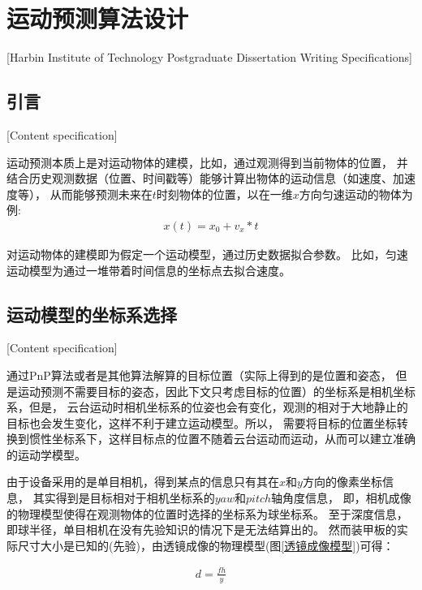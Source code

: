 


\chapter[运动预测算法设计]{运动预测算法设计}[Harbin Institute of Technology Postgraduate Dissertation Writing Specifications]


\section{引言}[Content specification]

运动预测本质上是对运动物体的建模，比如，通过观测得到当前物体的位置，
并结合历史观测数据（位置、时间戳等）能够计算出物体的运动信息（如速度、加速度等），
从而能够预测未来在$t$时刻物体的位置，以在一维$x$方向匀速运动的物体为例: 
\begin{gather}
    x(t) = x_0 + v_x*t
\end{gather}

对运动物体的建模即为假定一个运动模型，通过历史数据拟合参数。
比如，匀速运动模型为通过一堆带着时间信息的坐标点去拟合速度。




\section{运动模型的坐标系选择}[Content specification]

通过PnP算法或者是其他算法解算的目标位置（实际上得到的是位置和姿态，
但是运动预测不需要目标的姿态，因此下文只考虑目标的位置）的坐标系是相机坐标系，但是，
云台运动时相机坐标系的位姿也会有变化，观测的相对于大地静止的目标也会发生变化，这样不利于建立运动模型。所以，
需要将目标的位置坐标转换到惯性坐标系下，这样目标点的位置不随着云台运动而运动，从而可以建立准确的运动学模型。\par
由于设备采用的是单目相机，得到某点的信息只有其在$x$和$y$方向的像素坐标信息，
其实得到是目标相对于相机坐标系的$yaw$和$pitch$轴角度信息，
即，相机成像的物理模型使得在观测物体的位置时选择的坐标系为球坐标系。
至于深度信息，即球半径，单目相机在没有先验知识的情况下是无法结算出的。
然而装甲板的实际尺寸大小是已知的(先验)，由透镜成像的物理模型(图\ref{透镜成像模型})可得：\par
\begin{gather}
    d = \frac{fh}{y} 
\end{gather}

